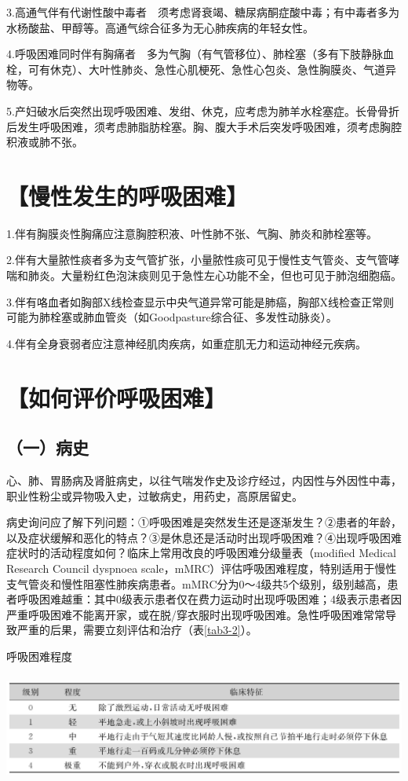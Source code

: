 3.高通气伴有代谢性酸中毒者　须考虑肾衰竭、糖尿病酮症酸中毒；有中毒者多为水杨酸盐、甲醇等。高通气综合征多为无心肺疾病的年轻女性。

4.呼吸困难同时伴有胸痛者　多为气胸（有气管移位）、肺栓塞（多有下肢静脉血栓，可有休克）、大叶性肺炎、急性心肌梗死、急性心包炎、急性胸膜炎、气道异物等。

5.产妇破水后突然出现呼吸困难、发绀、休克，应考虑为肺羊水栓塞症。长骨骨折后发生呼吸困难，须考虑肺脂肪栓塞。胸、腹大手术后突发呼吸困难，须考虑胸腔积液或肺不张。

\section{【慢性发生的呼吸困难】}

1.伴有胸膜炎性胸痛应注意胸腔积液、叶性肺不张、气胸、肺炎和肺栓塞等。

2.伴有大量脓性痰者多为支气管扩张，小量脓性痰可见于慢性支气管炎、支气管哮喘和肺炎。大量粉红色泡沫痰则见于急性左心功能不全，但也可见于肺泡细胞癌。

3.伴有咯血者如胸部X线检查显示中央气道异常可能是肺癌，胸部X线检查正常则可能为肺栓塞或肺血管炎（如Goodpasture综合征、多发性动脉炎）。

4.伴有全身衰弱者应注意神经肌肉疾病，如重症肌无力和运动神经元疾病。

\section{【如何评价呼吸困难】}

\subsection{（一）病史}

心、肺、胃肠病及肾脏病史，以往气喘发作史及诊疗经过，内因性与外因性中毒，职业性粉尘或异物吸入史，过敏病史，用药史，高原居留史。

病史询问应了解下列问题：①呼吸困难是突然发生还是逐渐发生？②患者的年龄，以及症状缓解和恶化的特点？③是休息还是活动时出现呼吸困难？④出现呼吸困难症状时的活动程度如何？临床上常用改良的呼吸困难分级量表（modified
Medical Research Council dyspnoea
scale，mMRC）评估呼吸困难程度，特别适用于慢性支气管炎和慢性阻塞性肺疾病患者。mMRC分为0～4级共5个级别，级别越高，患者呼吸困难越重：其中0级表示患者仅在费力运动时出现呼吸困难；4级表示患者因严重呼吸困难不能离开家，或在脱/穿衣服时出现呼吸困难。急性呼吸困难常常导致严重的后果，需要立刻评估和治疗（表\ref{tab3-2}）。

\begin{table}[htbp]
\centering
\caption{呼吸困难程度}
\label{tab3-2}
\includegraphics[width=5.90625in,height=1.39583in]{./images/Image00033.jpg}
\end{table}

